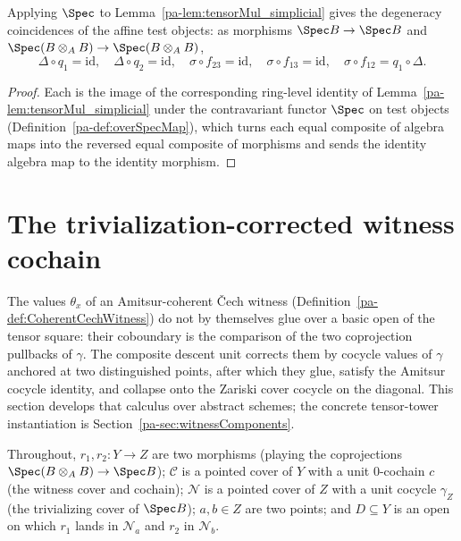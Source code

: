 \begin{lemma}
  \label{pa-lem:overSpecMap_left_degeneracy}
  \leanok

  Applying \(\Spec\) to Lemma~\ref{pa-lem:tensorMul_simplicial} gives the degeneracy coincidences
  of the affine test objects: as morphisms \(\Spec B \to \Spec B\) and
  \(\Spec(B \otimes_A B) \to \Spec(B \otimes_A B)\),
  \[
    \Delta \circ q_1 = \mathrm{id}, \quad \Delta \circ q_2 = \mathrm{id}, \quad
    \sigma \circ f_{23} = \mathrm{id}, \quad \sigma \circ f_{13} = \mathrm{id}, \quad
    \sigma \circ f_{12} = q_1 \circ \Delta .
  \]
\end{lemma}
\begin{proof}
  \leanok
  Each is the image of the corresponding ring-level identity of
  Lemma~\ref{pa-lem:tensorMul_simplicial} under the contravariant functor \(\Spec\) on test
  objects (Definition~\ref{pa-def:overSpecMap}), which turns each equal composite of algebra maps
  into the reversed equal composite of morphisms and sends the identity algebra map to the
  identity morphism.
\end{proof}

\section{The trivialization-corrected witness cochain}
\label{pa-sec:witnessCorrection}

The values \(\theta_x\) of an Amitsur-coherent \v Cech witness
(Definition~\ref{pa-def:CoherentCechWitness}) do not by themselves glue over a basic open of the
tensor square: their coboundary is the comparison of the two coprojection pullbacks of
\(\gamma\). The composite descent unit corrects them by cocycle values of \(\gamma\) anchored
at two distinguished points, after which they glue, satisfy the Amitsur cocycle identity, and
collapse onto the Zariski cover cocycle on the diagonal. This section develops that calculus
over abstract schemes; the concrete tensor-tower instantiation is
Section~\ref{pa-sec:witnessComponents}.

Throughout, \(r_1, r_2 \colon Y \to Z\) are two morphisms (playing the coprojections
\(\Spec(B \otimes_A B) \to \Spec B\)); \(\mathcal C\) is a pointed cover of \(Y\) with a unit
\(0\)-cochain \(c\) (the witness cover and cochain); \(\mathcal N\) is a pointed cover of
\(Z\) with a unit cocycle \(\gamma_Z\) (the trivializing cover of \(\Spec B\)); \(a, b \in Z\)
are two points; and \(D \subseteq Y\) is an open on which \(r_1\) lands in \(\mathcal N_a\) and
\(r_2\) in \(\mathcal N_b\).

